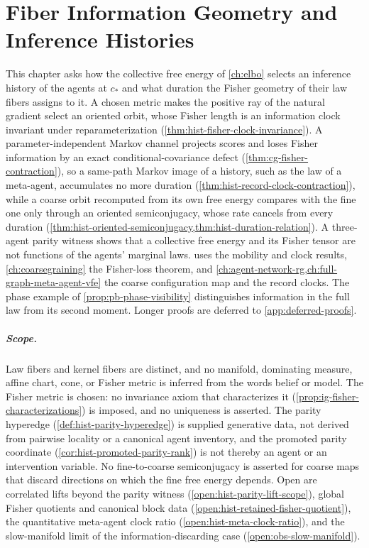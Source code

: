 \chapter{Fiber Information Geometry and Inference Histories}
\label{ch:relational-inference}

This chapter asks how the collective free energy of \cref{ch:elbo} selects an
inference history of the agents at $c_*$ and what duration the Fisher geometry of their
law fibers assigns to it.  A chosen metric makes the positive ray of the natural
gradient select an oriented orbit, whose Fisher length is an information clock
invariant under reparameterization (\cref{thm:hist-fisher-clock-invariance}).  A
parameter-independent Markov channel projects scores and loses Fisher information by an
exact conditional-covariance defect (\cref{thm:cg-fisher-contraction}), so a same-path
Markov image of a history, such as the law of a meta-agent, accumulates no more duration
(\cref{thm:hist-record-clock-contraction}), while a coarse orbit recomputed from its own
free energy compares with the fine one only through an oriented semiconjugacy, whose
rate cancels from every duration
(\cref{thm:hist-oriented-semiconjugacy,thm:hist-duration-relation}).  A three-agent
parity witness shows that a collective free energy and its Fisher tensor are not
functions of the agents' marginal laws.   uses the mobility and
clock results, \cref{ch:coarsegraining} the Fisher-loss theorem, and
\cref{ch:agent-network-rg,ch:full-graph-meta-agent-vfe} the coarse configuration map and
the record clocks. The phase example of \cref{prop:pb-phase-visibility} distinguishes
information in the full law from its second moment. Longer proofs are deferred to
\cref{app:deferred-proofs}.

\paragraph{Scope.}
Law fibers and kernel fibers are distinct, and no manifold, dominating measure, affine
chart, cone, or Fisher metric is inferred from the words belief or model.  The Fisher
metric is chosen: no invariance axiom that characterizes it
(\cref{prop:ig-fisher-characterizations}) is imposed, and no uniqueness is asserted.  The
parity hyperedge (\cref{def:hist-parity-hyperedge}) is supplied generative data, not
derived from pairwise locality or a canonical agent inventory, and the promoted parity
coordinate (\cref{cor:hist-promoted-parity-rank}) is not thereby an agent or an
intervention variable.  No fine-to-coarse semiconjugacy is asserted for coarse maps that
discard directions on which the fine free energy depends.  Open are correlated lifts
beyond the parity witness (\cref{open:hist-parity-lift-scope}), global Fisher quotients
and canonical block data (\cref{open:hist-retained-fisher-quotient}), the quantitative
meta-agent clock ratio (\cref{open:hist-meta-clock-ratio}), and the slow-manifold limit
of the information-discarding case (\cref{open:obs-slow-manifold}).  

